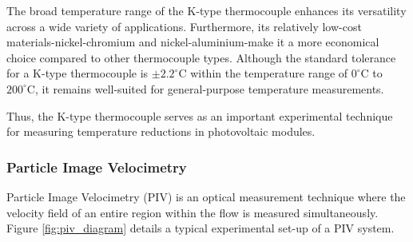 The broad temperature range of the K-type thermocouple enhances its versatility across a wide variety of applications. Furthermore, its relatively low-cost materials-nickel-chromium and nickel-aluminium-make it a more economical choice compared to other thermocouple types. Although the standard tolerance for a K-type thermocouple is $\pm2.2^\circ \text{C}$ within the temperature range of $0^\circ \text{C}$ to $200^\circ \text{C}$, it remains well-suited for general-purpose temperature measurements. \cite{ETWInternational2024KX2X7/0.2mm}\vspace{0.5em}

Thus, the K-type thermocouple serves as an important experimental technique for measuring temperature reductions in photovoltaic modules.\vspace{0.5em} 

\subsubsection{Particle Image Velocimetry}
Particle Image Velocimetry (PIV) is an optical measurement technique where the velocity field of an entire region within the flow is measured simultaneously. \cite{Atkins2016VelocityPIV} Figure \ref{fig:piv_diagram} details a typical experimental set-up of a PIV system.\vspace{0.5em}

